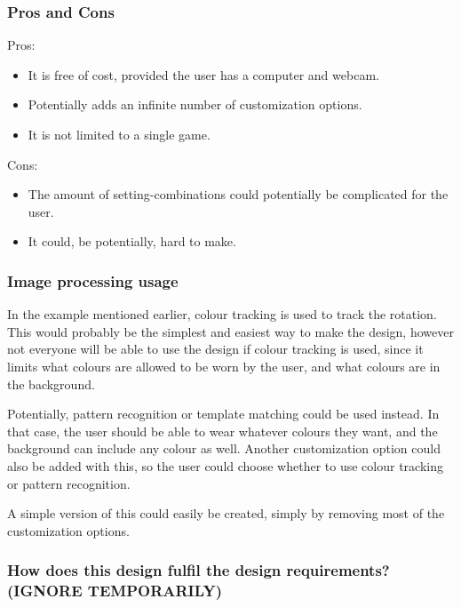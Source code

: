 \pagebreak[4]
\subsubsection*{Pros and Cons}
Pros:
\begin{itemize}
\item It is free of cost, provided the user has a computer and webcam.
\item Potentially adds an infinite number of customization options.
\item It is not limited to a single game.
\end{itemize}
Cons:
\begin{itemize}
\item The amount of setting-combinations could potentially be complicated for the user.
\item It could, be potentially, hard to make.
\end{itemize}

\subsubsection*{Image processing usage}
In the example mentioned earlier, colour tracking is used to track the rotation. This would probably be the simplest and easiest way to make the design, however not everyone will be able to use the design if colour tracking is used, since it limits what colours are allowed to be worn by the user, and what colours are in the background.

Potentially, pattern recognition or template matching could be used instead. In that case, the user should be able to wear whatever colours they want, and the background can include any colour as well. Another customization option could also be added with this, so the user could choose whether to use colour tracking or pattern recognition.

A simple version of this could easily be created, simply by removing most of the customization options.

\subsubsection*{How does this design fulfil the design requirements? (IGNORE TEMPORARILY)}